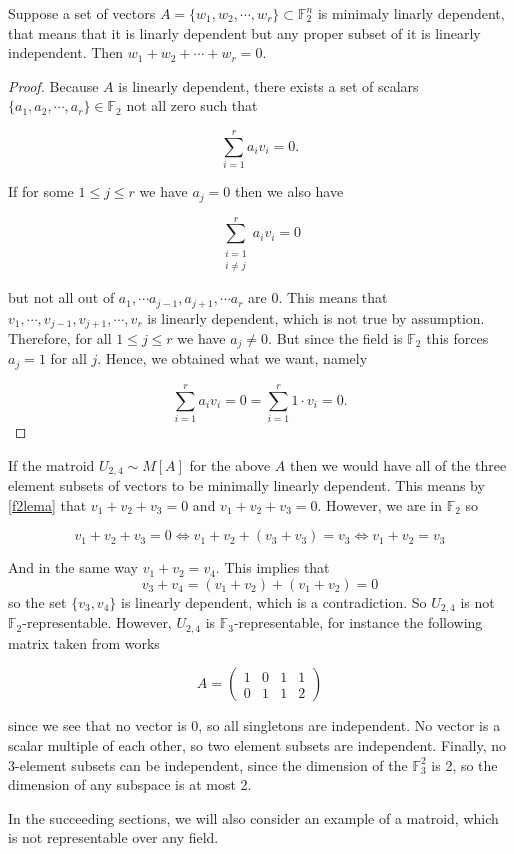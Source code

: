 \begin{lemma}
\label{f2lema}
    Suppose a set of vectors $A = \{w_1, w_2, \cdots, w_r\} \subset \mathbb{F}_2^n$ is minimaly linarly dependent, that means that it is linarly dependent but any proper subset of it is linearly independent. Then $w_1 + w_2 + \cdots + w_r = 0$.
\end{lemma}

\begin{proof}
    Because $A$ is linearly dependent, there exists a set of scalars $\{a_1, a_2, \cdots, a_r\}\in \mathbb{F}_2$ not all zero such that
    
    $$\sum_{i=1}^r a_iv_i = 0.$$
    
    If for some $1\leq j \leq r$ we have $a_j = 0$ then we also have 
    
    $$\sum\limits_{\substack{i = 1 \\ i \neq j}} ^r a_iv_i = 0$$

    but not all out of $a_1, \cdots a_{j-1}, a_{j+1}, \cdots a_r$ are 0. This means that ${v_1, \cdots, v_{j-1}, v_{j+1}, \cdots, v_r}$ is linearly dependent, which is not true by assumption. Therefore, for all $1\leq j \leq r$ we have $a_j \neq 0$. But since the field is $\mathbb{F}_2$ this forces $a_j = 1$ for all $j$. Hence, we obtained what we want, namely

     $$\sum_{i=1}^r a_iv_i = 0 =  \sum_{i=1}^r 1 \cdot v_i = 0.$$
    
\end{proof}

If the matroid $U_{2,4} \sim M[A]$ for the above $A$ then we would have all of the three element subsets of vectors to be minimally linearly dependent. This means by \ref{f2lema} that $v_1 + v_2 + v_3 = 0$ and $v_1 + v_2 + v_3 = 0$. However, we are in $\mathbb{F}_2$ so 


$$v_1 + v_2 + v_3 = 0 \iff v_1 + v_2 + (v_3 + v_3) = v_3 \iff v_1 + v_2 = v_3 $$

And in the same way $v_1 + v_2 = v_4$. This implies that
$$v_3 + v_4 = (v_1 + v_2 )+ (v_1 + v_2) = 0$$
so the set $\{v_3, v_4\}$ is linearly dependent, which is a contradiction. So $U_{2,4}$ is not $\mathbb{F}_2$-representable. However, $U_{2,4}$ is $\mathbb{F}_3$-representable, for instance the following matrix taken from \cite[20]{oxley1} works

$$A = \begin{pmatrix}
    1 & 0 & 1 & 1 \\
    0 & 1 & 1 & 2
\end{pmatrix}$$

since we see that no vector is 0, so all singletons are independent. No vector is a scalar multiple of each other, so two element subsets are independent. Finally, no 3-element subsets can be independent, since the dimension of the $\mathbb{F}_3^2$ is 2, so the dimension of any subspace is at most 2.

In the succeeding sections, we will also consider an example of a matroid, which is not representable over any field.
